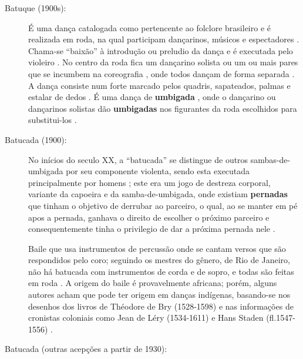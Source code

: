 \begin{description}
\item [Batuque (1900s):]
\label{ref:batuquedanca}
É uma dança catalogada como pertencente ao folclore brasileiro  \cite[pp. 96]{sandroni2001feitico} e
é realizada em roda, na qual participam dançarinos, músicos e espectadores \cite[pp. 89]{marcondes1977enciclopedia}.
Chama-se ``baixão'' à introdução ou preludio da dança  e é executada pelo violeiro  \cite[pp. 89]{marcondes1977enciclopedia}.
No centro da roda fica um dançarino solista ou um ou mais pares
que se incumbem na coreografia \cite[pp. 89]{marcondes1977enciclopedia},
onde todos dançam de forma separada \cite[pp. 65]{sandroni2001feitico}.
A dança consiste num forte marcado pelos quadris, sapateados, palmas e estalar de dedos  \cite[pp. 89]{marcondes1977enciclopedia}.
É uma dança de \textbf{umbigada} \cite[pp. 96]{sandroni2001feitico} \cite[pp. 89]{marcondes1977enciclopedia}, 
onde o dançarino ou dançarinos solistas
dão \textbf{umbigadas} nos figurantes da roda  escolhidos para substitui-los \cite[pp. 89]{marcondes1977enciclopedia}.



\item [Batucada (1900):]
\label{ref:batucadadanca}
No inícios do seculo XX,
a ``batucada'' se distingue de outros sambas-de-umbigada por seu componente violenta, 
sendo esta executada principalmente por homens \cite[pp. 8]{reffolclorebatucadajornal} \cite[pp. 103]{sandroni2001feitico};
este era um jogo de destreza corporal, variante da capoeira e da samba-de-umbigada,
onde existiam \textbf{pernadas} que tinham o objetivo de derrubar ao parceiro, o qual, ao se manter em pé apos a pernada,
ganhava o direito de escolher o próximo parceiro
 e consequentemente tinha o privilegio de dar a próxima pernada nele \cite[pp. 103]{sandroni2001feitico}.

Baile que usa instrumentos de percussão onde se cantam versos que são respondidos pelo coro;
seguindo os mestres do gênero, de Rio de Janeiro, 
não há batucada com instrumentos de corda e de sopro, 
e  todas são feitas em roda \cite[pp. 89]{marcondes1977enciclopedia}.
A origem do baile é provavelmente africana; porém, alguns autores acham que pode ter origem em  danças indígenas,
basando-se nos desenhos dos livros de Théodore de Bry (1528-1598) e
nas informações de cronistas coloniais como Jean de Léry (1534-1611) e
Hans Staden (fl.1547-1556) \cite[pp. 89]{marcondes1977enciclopedia}.


\item [Batucada (outras acepções a partir de 1930):]
\label{ref:batucadadanca1930}


\end{description}
